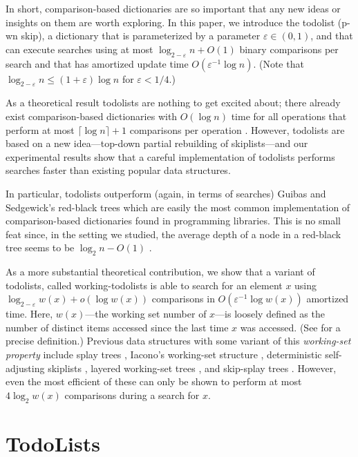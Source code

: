 \documentclass[lotsofwhite]{patmorin}
\newcommand{\eps}{\varepsilon}
\begin{document}
In short, comparison-based dictionaries are so important that any
new ideas or insights on them are worth exploring.  In this paper,
we introduce the todolist (p-wn skip),
a dictionary that is parameterized by a parameter $\eps\in(0,1)$, and
that can execute searches using at most $\log_{2-\eps} n + O(1)$ binary
comparisons per search and that has amortized update time $O(\eps^{-1}\log
n)$.  (Note that $\log_{2-\eps} n \le (1+\eps)\log n$ for $\eps < 1/4$.)

As a theoretical result todolists are nothing to get excited about; there
already exist comparison-based dictionaries with $O(\log n)$ time for all
operations that perform at most $\lceil\log n\rceil+1$ comparisons per
operation \cite{andersson.lai:fast,fagerberg:binary}. However, todolists
are based on a new idea---top-down partial rebuilding of skiplists---and
our experimental results show that a careful implementation of todolists
performs searches faster than existing popular data structures.

In particular, todolists outperform (again, in terms of searches) Guibas
and Sedgewick's red-black trees \cite{guibas.sedgewick:dichromatic} which are
easily the most common implementation of comparison-based dictionaries
found in programming libraries. This is no small feat since, in the
setting we studied, the average depth of a node in a red-black tree
seems to be $\log_2 n - O(1)$ \cite{sedgewick:left-leaning}.

As a more substantial theoretical contribution, we show that a
variant of todolists, called working-todolists is able to search for
an element $x$ using $\log_{2-\eps} w(x)+o(\log w(x))$ comparisons
in $O(\eps^{-1}\log w(x))$ amortized time.  Here, $w(x)$---the
working set number of $x$---is loosely defined as the number of
distinct items accessed since the last time $x$ was accessed. (See
 for a precise definition.)  Previous data
structures with some variant of this \emph{working-set property}
include splay trees \cite{sleator.tarjan:self-adjusting}, Iacono's
working-set structure \cite{iacono:alternatives,badoiu.cole.ea:unified},
deterministic self-adjusting skiplists \cite{bose.douieb.ea:dynamic},
layered working-set trees \cite{bose.douieb.ea:layered}, and skip-splay
trees \cite{derryberry.sleator:skip-splay}.  However, even the most
efficient of these can only be shown to perform at most $4\log_2 w(x)$
comparisons during a search for $x$.

\section{TodoLists}
\end{document}
